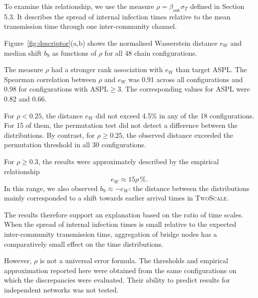 \documentclass[a4paper,fleqn]{cas-sc}
\newcommand{\TS}{\textup{\textsc{TwoScale}}}
\newcommand{\eW}{e_{W}}
\begin{document}
To examine this relationship, we use the measure $\rho=\beta_{\mathrm{out}}\sigma_T$ defined in Section 5.3. It describes the spread of internal infection times relative to the mean transmission time through one inter-community channel.

Figure~\ref{fig:descriptor}(a,b) shows the normalised Wasserstein distance $\eW$ and median shift $b_9$ as functions of $\rho$ for all 48 chain configurations.

The measure $\rho$ had a stronger rank association with $\eW$ than target ASPL. The Spearman correlation between $\rho$ and $\eW$ was 0.91 across all configurations and 0.98 for configurations with $\mathrm{ASPL}\geq3$. The corresponding values for ASPL were 0.82 and 0.66.

For $\rho<0.25$, the distance $\eW$ did not exceed 4.5\% in any of the 18 configurations. For 15 of them, the permutation test did not detect a difference between the distributions. By contrast, for $\rho\geq0.25$, the observed distance exceeded the permutation threshold in all 30 configurations.

For $\rho\geq0.3$, the results were approximately described by the empirical relationship
\begin{equation}
\eW \approx 15\rho\,\%.
\end{equation}
In this range, we also observed $b_9\approx-\eW$: the distance between the distributions mainly corresponded to a shift towards earlier arrival times in \TS{}.

The results therefore support an explanation based on the ratio of time scales. When the spread of internal infection times is small relative to the expected inter-community transmission time, aggregation of bridge nodes has a comparatively small effect on the time distributions.

However, $\rho$ is not a universal error formula. The thresholds and empirical approximation reported here were obtained from the same configurations on which the discrepancies were evaluated. Their ability to predict results for independent networks was not tested.
\end{document}

